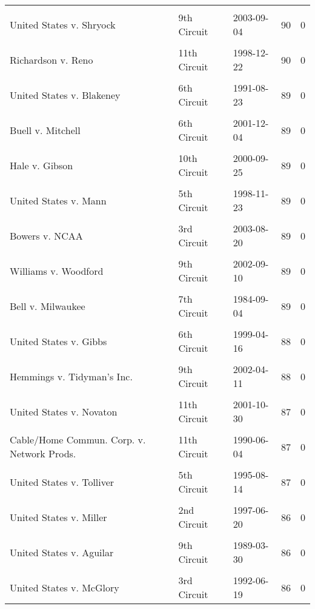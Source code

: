 \documentclass[10pt, letterpaper]{article}
\begin{document}
\begin{spacing}{1.0}
\begin{footnotesize}
\begin{longtable}[H]{p{3.5in}llrr}
& & & &\\[-6pt]
United States v. Shryock & 9th Circuit & 2003-09-04 & 90 & 0\\
& & & &\\[-6pt]
Richardson v. Reno & 11th Circuit & 1998-12-22 & 90 & 0\\
& & & &\\[-6pt]
United States v. Blakeney & 6th Circuit & 1991-08-23 & 89 & 0\\
& & & &\\[-6pt]
Buell v. Mitchell & 6th Circuit & 2001-12-04 & 89 & 0\\
& & & &\\[-6pt]
Hale v. Gibson & 10th Circuit & 2000-09-25 & 89 & 0\\
& & & &\\[-6pt]
United States v. Mann & 5th Circuit & 1998-11-23 & 89 & 0\\
& & & &\\[-6pt]
Bowers v. NCAA & 3rd Circuit & 2003-08-20 & 89 & 0\\
& & & &\\[-6pt]
Williams v. Woodford & 9th Circuit & 2002-09-10 & 89 & 0\\
& & & &\\[-6pt]
Bell v. Milwaukee & 7th Circuit & 1984-09-04 & 89 & 0\\
& & & &\\[-6pt]
United States v. Gibbs & 6th Circuit & 1999-04-16 & 88 & 0\\
& & & &\\[-6pt]
Hemmings v. Tidyman's Inc. & 9th Circuit & 2002-04-11 & 88 & 0\\
& & & &\\[-6pt]
United States v. Novaton & 11th Circuit & 2001-10-30 & 87 & 0\\
& & & &\\[-6pt]
Cable/Home Commun. Corp. v. Network Prods. & 11th Circuit & 1990-06-04 & 87 & 0\\
& & & &\\[-6pt]
United States v. Tolliver & 5th Circuit & 1995-08-14 & 87 & 0\\
& & & &\\[-6pt]
United States v. Miller & 2nd Circuit & 1997-06-20 & 86 & 0\\
& & & &\\[-6pt]
United States v. Aguilar & 9th Circuit & 1989-03-30 & 86 & 0\\
& & & &\\[-6pt]
United States v. McGlory & 3rd Circuit & 1992-06-19 & 86 & 0\\

\end{longtable}
\end{footnotesize}
\end{spacing}
\end{document}
